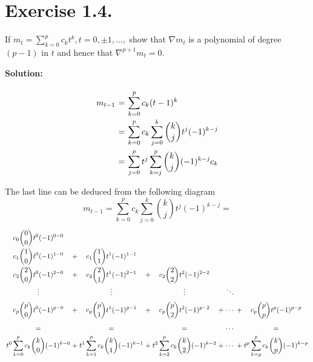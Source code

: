 \section*{Exercise 1.4.}

If $m_t = \sum_{k = 0}^{p}c_k t^{k}, t = 0,\pm 1,\ldots,$ show that $\nabla m_t$ is a polynomial of degree $(p-1)$ in $t$ and hence that $\nabla^{p+1}m_t = 0$.

\textbf{Solution:}

\[ \everymath{\displaystyle}
\arraycolsep=1.8pt\def\arraystretch{2.5}
\begin{array}{rcl}
    m_{t-1} & = & \sum_{k = 0}^{p}c_k (t-1)^{k}\\
    & = & \sum_{k = 0}^{p}c_k \sum_{j = 0}^k \binom{k}{j} t^{j} (-1)^{k-j}\\
    & = & \sum_{j = 0}^{p} t^j \sum_{k = j}^{p} \binom{k}{j} (-1)^{k-j} c_k
\end{array} \]

The last line can be deduced from the following diagram
\[ m_{t-1} = \sum_{k = 0}^{p}c_k \sum_{j = 0}^k \binom{k}{j} t^{j} (-1)^{k-j} = \]
\[ \everymath{\displaystyle}
\arraycolsep=1.3pt\def\arraystretch{2}
\begin{array}{ccccccccccc}
    c_0 \binom{0}{0} t^0 (-1)^{0-0}\\
    c_1 \binom{1}{0} t^0 (-1)^{1-0} & + & c_1 \binom{1}{1} t^1 (-1)^{1-1}\\
    c_2 \binom{2}{0} t^0 (-1)^{2-0} & + & c_2 \binom{2}{1} t^1 (-1)^{2-1} & + & c_2 \binom{2}{2} t^2 (-1)^{2-2}\\
    \vdots &  & \vdots &  & \vdots &  & \ddots \\
    c_p \binom{p}{0} t^0 (-1)^{p-0} & + & c_p \binom{p}{1} t^1 (-1)^{p-1} & + & c_p \binom{p}{2} t^2 (-1)^{p-2} & + & \cdots & + & c_p \binom{p}{p} t^p (-1)^{p-p}\\
    = & & = & & = & & \cdots & & =\\
    t^0 \sum_{k = 0}^{p}c_k\binom{k}{0}(-1)^{k-0} & + & 
    t^1 \sum_{k = 1}^{p}c_k\binom{k}{1}(-1)^{k-1} & + &
    t^2 \sum_{k = 2}^{p}c_k\binom{k}{2}(-1)^{k-2} & + & \cdots & + &
    t^p \sum_{k = p}^{p}c_k\binom{k}{p}(-1)^{k-p}
\end{array} \]

